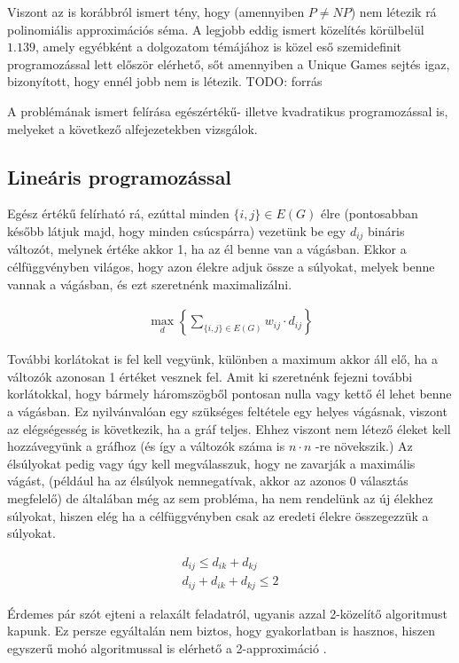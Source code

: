 Viszont az is korábbról ismert tény, hogy (amennyiben $P \neq NP$) nem létezik rá polinomiális approximációs séma. A legjobb eddig ismert közelítés körülbelül $1.139$, amely egyébként a dolgozatom témájához is közel eső szemidefinit programozással lett először elérhető, sőt amennyiben a Unique Games sejtés igaz, bizonyított, hogy ennél jobb nem is létezik. TODO: forrás

A problémának ismert felírása egészértékű- illetve kvadratikus programozással is, melyeket a következő alfejezetekben vizsgálok.

\subsection{Lineáris programozással}

Egész értékű felírható rá, ezúttal minden $\{i,j\} \in E(G)$ élre (pontosabban később látjuk majd, hogy minden csúcspárra) vezetünk be egy $d_{ij}$ bináris változót, melynek értéke akkor 1, ha az él benne van a vágásban. Ekkor a célfüggvényben világos, hogy azon élekre adjuk össze a súlyokat, melyek benne vannak a vágásban, és ezt szeretnénk maximalizálni.

\begin{align}
	\max_{d} \left\{ \sum_{\{i,j\}\in E(G)}{w_{ij}\cdot d_{ij}}\right\}
\end{align}

További korlátokat is fel kell vegyünk, különben a maximum akkor áll elő, ha a változók azonosan 1 értéket vesznek fel.
Amit ki szeretnénk fejezni további korlátokkal, hogy bármely háromszögből pontosan nulla vagy kettő él lehet benne a vágásban. Ez nyilvánvalóan egy szükséges feltétele egy helyes vágásnak, viszont az elégségesség is következik, ha a gráf teljes. Ehhez viszont nem létező éleket kell hozzávegyünk a gráfhoz (és így a változók száma is $n \cdot n$ -re növekszik.) Az élsúlyokat pedig vagy úgy kell megválasszuk, hogy ne zavarják a maximális vágást, (például ha az élsúlyok nemnegatívak, akkor az azonos 0 választás megfelelő) de általában még az sem probléma, ha nem rendelünk az új élekhez súlyokat, hiszen elég ha a célfüggvényben csak az eredeti élekre összegezzük a súlyokat.

\begin{align}
 d_{ij} \leq d_{ik}+d_{kj}  \\
 d_{ij}+d_{ik}+d_{kj} \leq 2  
\end{align}

Érdemes pár szót ejteni a relaxált feladatról, ugyanis azzal 2-közelítő algoritmust kapunk. Ez persze egyáltalán nem biztos, hogy gyakorlatban is hasznos, hiszen egyszerű mohó algoritmussal is elérhető a 2-approximáció \cite{10.5555/1283383.1283390, POLJAK1994191}.


